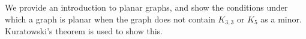 


We provide an introduction to planar graphs, and show the conditions under which a graph is planar when the graph does not contain $K_{3,3}$ or $K_5$ as a minor. Kuratowski's theorem is used to show this.













